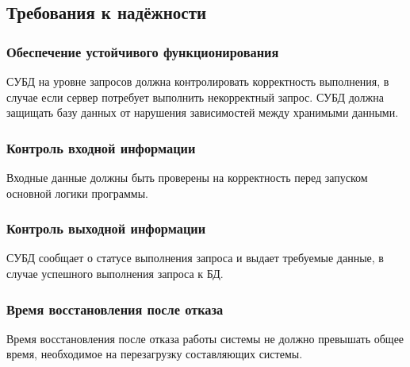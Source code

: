 \subsection{Требования к надёжности}

\subsubsection{Обеспечение устойчивого функционирования}

СУБД на уровне запросов должна контролировать корректность выполнения, в случае если сервер потребует выполнить некорректный запрос. СУБД должна защищать базу данных от нарушения зависимостей между хранимыми данными. 

\subsubsection{Контроль входной информации}

Входные данные должны быть проверены на корректность перед запуском основной логики программы.

\subsubsection{Контроль выходной информации}

СУБД сообщает о статусе выполнения запроса и выдает требуемые данные, в случае успешного выполнения запроса к БД.

\subsubsection{Время восстановления после отказа}

Время восстановления после отказа работы системы не должно превышать общее время, необходимое на перезагрузку составляющих системы.